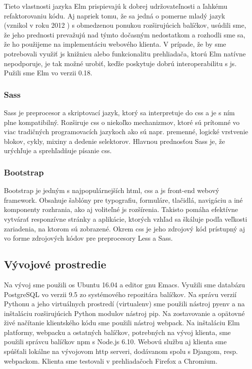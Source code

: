Tieto vlastnosti jazyka Elm prispievajú k dobrej udržovateľnosti a ľahkému
refaktorovaniu kódu. Aj napriek tomu, že sa jedná o pomerne mladý jazyk (vznikol
v roku 2012 \cite{elm_thesis}) s obmedzenou ponukou rozširujúcich balíčkov,
usúdili sme, že jeho prednosti prevažujú nad týmto dočasným nedostatkom a
rozhodli sme sa, že ho použijeme na implementáciu webového klienta. V prípade,
že by sme potrebovali využiť \acrshort{js} knižnicu alebo funkcionalitu
prehliadača, ktorú Elm natívne nepodporuje, je tak možné urobiť, keďže poskytuje
dobrú interoperabilitu s \acrshort{js}. Pužili sme Elm vo verzii 0.18.

\subsubsection{Sass}

Sass je preprocesor a skriptovací jazyk, ktorý sa interpretuje do \acrshort{css}
a je s ním plne kompatibilný. Rozširuje \acrshort{css} o niekoľko mechanizmov,
ktoré sú prítomné vo viac tradičných programovacích jazykoch ako sú napr.
premenné, logické vrstvenie blokov, cykly, mixiny a dedenie selektorov.
\cite{sass} Hlavnou prednosťou Sass je, že urýchľuje a sprehľadňuje písanie
\acrshort{css}.

\subsubsection{Bootstrap}

Bootstrap je jedným s najpopulárnejších \acrshort{html}, \acrshort{css} a
\acrshort{js} front-end webový framework. Obsahuje šablóny pre typografiu,
formuláre, tlačidlá, navigáciu a iné komponenty rozhrania, ako aj voliteľné
\acrshort{js} rozšírenia. Takisto pomáha efektívne vytvárať responzívne stránky
a aplikácie, ktorých vzhľad sa škáluje podľa veľkosti zariadenia, na ktorom sú
zobrazené. Okrem \acrshort{css} je jeho zdrojový kód prístupný aj vo forme
zdrojových kódov pre preprocesory Less a Sass. \cite{bootstrap}

\subsection{Vývojové prostredie}
\label{subsec:develop_env}

Na vývoj sme použili \acrshort{os} Ubuntu 16.04 a editor \acrshort{gnu} Emacs.
Využili sme databázu PostgreSQL vo verzii 9.5 zo systémového repozitára
balíčkov. Na správu verzií Pythonu a jeho virtuálnych prostredí (virtualenv) sme
použili nástroj pyenv a na inštaláciu rozširujúcich Python modulov nástroj pip.
Na zostavovanie a opätovné živé načítanie klientského kódu sme použili nástroj
webpack. Na inštaláciu Elm platformy, webpacku a ostatných balíčkov, potrebných
na vývoj klienta, sme použili správcu balíčkov npm s Node.js 6.10. Webovú službu
aj klienta sme spúšťali lokálne na vývojovom \acrshort{http} serveri, dodávanom
spolu s Djangom, resp. webpackom. Klienta sme testovali v prehliadačoch Firefox
a Chromium.

